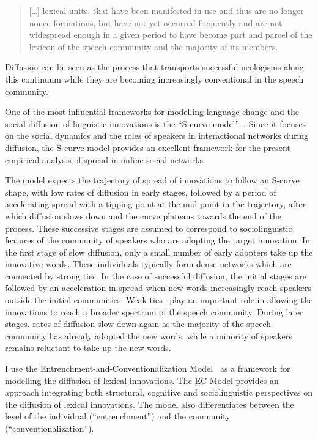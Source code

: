 \documentclass[
  a4paper,
  abstract=on,
  captions=tableabove
  ]{scrartcl}
\begin{document}
    \blockquote[{\cite[31]{Kerremans2015WebNew}}]{
      [\dots] lexical units, that have been manifested in use and thus are no longer nonce-formations, but have not yet occurred frequently and are not widespread enough in a given period to have become part and parcel of the lexicon of the speech community and the majority of its members.
      }

    Diffusion can be seen as the process that transports successful neologisms along this continuum while they are becoming increasingly conventional in the speech community.
  
    One of the most influential frameworks for modelling language change and the social diffusion of linguistic innovations is the \enquote{S-curve model}~\parencite{Milroy1992LinguisticVariation, Nevalainen2015DescriptiveAdequacy, Labov2007TransmissionDiffusion}. Since it focuses on the social dynamics and the roles of speakers in interactional networks during diffusion, the S-curve model provides an excellent framework for the present empirical analysis of spread in online social networks.

      The model expects the trajectory of spread of innovations to follow an S-curve shape, with low rates of diffusion in early stages, followed by a period of accelerating spread with a tipping point at the mid point in the trajectory, after which diffusion slows down and the curve plateaus towards the end of the process. These successive stages are assumed to correspond to sociolinguistic features of the community of speakers who are adopting the target innovation. In the first stage of slow diffusion, only a small number of early adopters take up the innovative words. These individuals typically form dense networks which are connected by strong ties. In the case of successful diffusion, the initial stages are followed by an acceleration in spread when new words increasingly reach speakers outside the initial communities. Weak ties~\parencite{Granovetter1977StrengthWeak} play an important role in allowing the innovations to reach a broader spectrum of the speech community. During later stages, rates of diffusion slow down again as the majority of the speech community has already adopted the new words, while a minority of speakers remains reluctant to take up the new words.

      

          I use the Entrenchment-and-Conventionalization Model~\parencite{Schmid2020DynamicsLinguistic} as a framework for modelling the diffusion of lexical innovations. The EC-Model provides an approach integrating both structural, cognitive and sociolinguistic perspectives on the diffusion of lexical innovations. The model also differentiates between the level of the individual (\enquote{entrenchment}) and the community (\enquote{conventionalization}).
      
\end{document}
